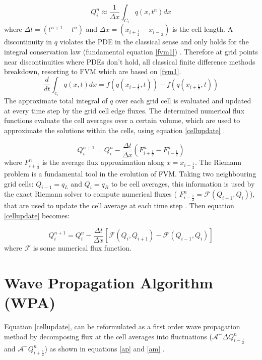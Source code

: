 \documentclass[11pt,a4paper]{article}
\begin{document}
	\begin{equation}
		Q_{i}^{n} \approx \dfrac{1}{\Delta x} \int_{C_{i}}q(x,t^{n})dx
		\label{wpa0}
	\end{equation}
	where $\Delta t = (t^{n+1} - t^{n})$ and  $\Delta x = (x_{i+\frac{1}{2}} - x_{i-\frac{1}{2}})$ is the cell length. A discontinuity in $q$ violates the PDE in the classical sense and only holds for the integral conservation law (fundamental equation \eqref{fvm1})  \cite{leveque2002finite}. Therefore at grid points near discontinuities where PDEs don't hold, all classical finite difference methods breakdown, resorting to FVM which are based on \eqref{fvm1}. 	
	\begin{equation}
		\frac{d}{dt} \int_{c_{i}} q(x,t)dx = f(q(x_{i-\frac{1}{2}},t)) -  f(q(x_{i+\frac{1}{2}},t))
		\label{fvm1}
	\end{equation}	
	The approximate  total integral of $q$ over each grid cell is evaluated and updated at every time step by the grid cell edge fluxes. The determined numerical flux functions evaluate the  cell averages over a certain volume, which are used to approximate the solutions within the cells, using equation \eqref{cellupdate}  \cite{le-ge-be:2011}.
	
	\begin{equation}
		Q_{i}^{n+1} = Q_{i}^{n} - \frac{\Delta t}{\Delta x} (F_{i+\frac{1}{2}}^{n} - F_{i-\frac{1}{2}}^{n})
		\label{cellupdate}
	\end{equation}	
	where $F_{i+\frac{1}{2}}^{n} $ is the average flux approximation along $x=x_{i-\frac{1}{2}}$.
	The Riemann problem is a fundamental tool in the evolution of FVM. Taking two neighbouring grid cells: $Q_{i-1} = q_{L}$ and $Q_{i} = q_{R}$ to be cell averages, this information is used by the exact Riemann solver to compute numerical fluxes ( $F_{i-\frac{1}{2}}^{n} = \mathcal{F}(Q_{i-1} , Q_{i} )$), that are used to update the cell average at each time step  \cite{ba-le-mi-ro:2003}. Then equation \eqref{cellupdate} becomes:
	
	\begin{equation}
		Q_{i}^{n+1} = Q_{i}^{n} - \frac{\Delta t}{\Delta x} \left[ \mathcal{F}(Q_{i} , Q_{i+1} ) - \mathcal{F}(Q_{i-1} , Q_{i} ) \right]
		\label{cellupdat}
	\end{equation}
	where $\mathcal{F}$ is some numerical flux function.\\
	
	\section{Wave Propagation Algorithm (WPA)}
	Equation \eqref{cellupdate}, can be reformulated as a first order wave propagation method by decomposing flux at the cell averages into fluctuations ($\mathcal{A^{+}}\Delta 	Q_{i-\frac{1}{2}}^{n}$ and  $\mathcal{A^{-}}Q_{i+\frac{1}{2}}^{n}$) as shown in equations \eqref{ap} and \eqref{am}  \cite{ma-ah-be-ca-ge-ha-ke-le-le:2016}. 
	
\end{document}
